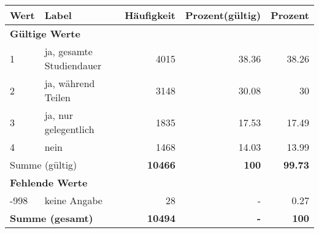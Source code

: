      \begin{longtable}{lXrrr}
     \toprule
     \textbf{Wert} & \textbf{Label} & \textbf{Häufigkeit} & \textbf{Prozent(gültig)} & \textbf{Prozent} \\
     \endhead
     \midrule
     \multicolumn{5}{l}{\textbf{Gültige Werte}}\\

     1 &
     \multicolumn{1}{X}{ ja, gesamte Studiendauer   } &


       \num{4015} &
       \num[round-mode=places,round-precision=2]{38,36} &
         \num[round-mode=places,round-precision=2]{38,26} \\

     2 &
     \multicolumn{1}{X}{ ja, während Teilen   } &


       \num{3148} &
       \num[round-mode=places,round-precision=2]{30,08} &
         \num[round-mode=places,round-precision=2]{30} \\

     3 &
     \multicolumn{1}{X}{ ja, nur gelegentlich   } &


       \num{1835} &
       \num[round-mode=places,round-precision=2]{17,53} &
         \num[round-mode=places,round-precision=2]{17,49} \\

     4 &
     \multicolumn{1}{X}{ nein   } &


       \num{1468} &
       \num[round-mode=places,round-precision=2]{14,03} &
         \num[round-mode=places,round-precision=2]{13,99} \\
     \midrule
     \multicolumn{2}{l}{Summe (gültig)} &
       \textbf{\num{10466}} &
     \textbf{100} &
       \textbf{\num[round-mode=places,round-precision=2]{99,73}} \\
     \multicolumn{5}{l}{\textbf{Fehlende Werte}}\\
       -998 &
       keine Angabe &
         \num{28} &
        - &
         \num[round-mode=places,round-precision=2]{0,27} \\
     \midrule
     \multicolumn{2}{l}{\textbf{Summe (gesamt)}} &
          \textbf{\num{10494}} &
        \textbf{-} &
        \textbf{100} \\
     \bottomrule
     \end{longtable}
     
